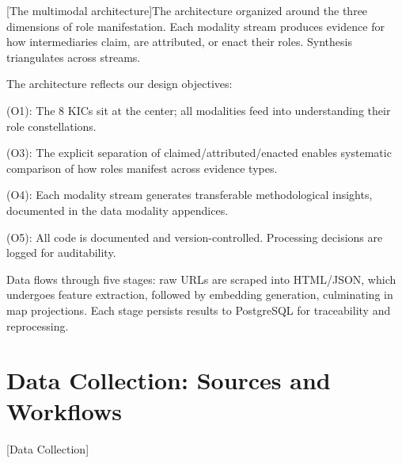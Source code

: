 \documentclass[../main.tex]{subfiles}
\begin{document}
\begin{center}
[The \RoleBox multimodal architecture]{The \RoleBox architecture organized around the three dimensions of role manifestation. Each modality stream produces evidence for how intermediaries claim, are attributed, or enact their roles. Synthesis triangulates across streams.}
\label{fig:toolkit-architecture}
\end{center}

The architecture reflects our design objectives:

\begin{description}[leftmargin=0.5cm, itemsep=0.2em]
\item[Intermediary focus] (O1): The 8 KICs sit at the center; all modalities feed into understanding their role constellations.
\item[Triangulation] (O3): The explicit separation of claimed/attributed/enacted enables systematic comparison of how roles manifest across evidence types.
\item[Design knowledge] (O4): Each modality stream generates transferable methodological insights, documented in the data modality appendices.
\item[Transparency] (O5): All code is documented and version-controlled. Processing decisions are logged for auditability.
\end{description}

Data flows through five stages: raw URLs are scraped into HTML/JSON, which undergoes feature extraction, followed by embedding generation, culminating in map projections. Each stage persists results to PostgreSQL for traceability and reprocessing.


\section{Data Collection: Sources and Workflows}[Data Collection]
\end{document}
